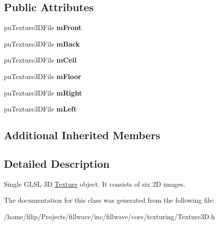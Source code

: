 \subsection*{Public Attributes}
\begin{DoxyCompactItemize}
\item 
\hypertarget{classfillwave_1_1core_1_1Texture3D_ac6cb2f3225b5dc382a6bd5b71bba0681}{}pu\+Texture3\+D\+File {\bfseries m\+Front}\label{classfillwave_1_1core_1_1Texture3D_ac6cb2f3225b5dc382a6bd5b71bba0681}

\item 
\hypertarget{classfillwave_1_1core_1_1Texture3D_aaa85cc2c3c37b900630a91744124579d}{}pu\+Texture3\+D\+File {\bfseries m\+Back}\label{classfillwave_1_1core_1_1Texture3D_aaa85cc2c3c37b900630a91744124579d}

\item 
\hypertarget{classfillwave_1_1core_1_1Texture3D_ab90001919afac89b34a3f26d9885d745}{}pu\+Texture3\+D\+File {\bfseries m\+Ceil}\label{classfillwave_1_1core_1_1Texture3D_ab90001919afac89b34a3f26d9885d745}

\item 
\hypertarget{classfillwave_1_1core_1_1Texture3D_a10f80935543ba00ca905f1d1aa3fe883}{}pu\+Texture3\+D\+File {\bfseries m\+Floor}\label{classfillwave_1_1core_1_1Texture3D_a10f80935543ba00ca905f1d1aa3fe883}

\item 
\hypertarget{classfillwave_1_1core_1_1Texture3D_acba1a7cf4762a7121e6575664e4f37fe}{}pu\+Texture3\+D\+File {\bfseries m\+Right}\label{classfillwave_1_1core_1_1Texture3D_acba1a7cf4762a7121e6575664e4f37fe}

\item 
\hypertarget{classfillwave_1_1core_1_1Texture3D_a877f6d16e5edefea7e03aebce0736c6a}{}pu\+Texture3\+D\+File {\bfseries m\+Left}\label{classfillwave_1_1core_1_1Texture3D_a877f6d16e5edefea7e03aebce0736c6a}

\end{DoxyCompactItemize}
\subsection*{Additional Inherited Members}


\subsection{Detailed Description}
Single G\+L\+S\+L 3\+D \hyperlink{classfillwave_1_1core_1_1Texture}{Texture} object. It consists of six 2\+D images. 

The documentation for this class was generated from the following file\+:\begin{DoxyCompactItemize}
\item 
/home/filip/\+Projects/fillwave/inc/fillwave/core/texturing/Texture3\+D.\+h\end{DoxyCompactItemize}
